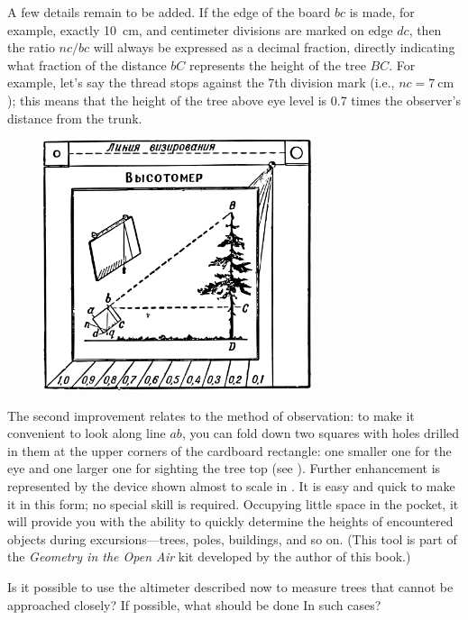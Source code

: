 A few details remain to be added. If the edge of the board $bc$ is made, for example, exactly \SI{10}{\centi\meter}, and centimeter divisions are marked on edge $dc$, then the ratio $nc/bc$ will always be expressed as a decimal fraction, directly indicating what fraction of the distance $bC$ represents the height of the tree $BC$. For example, let's say the thread stops against the 7th division mark (i.e., $nc = \SI{7}{\centi\meter}$); this means that the height of the tree above eye level is 0.7 times the observer's distance from the trunk.

\begin{figure}[h!]
\centering
\includegraphics[width=0.7\textwidth]{figures/ch-01/fig-01-12.pdf}
\end{figure}

The second improvement relates to the method of observation: to make it convenient to look along line $ab$, you can fold down two squares with holes drilled in them at the upper corners of the cardboard rectangle: one smaller one for the eye and one larger one for sighting the tree top (see ). Further enhancement is represented by the device shown almost to scale in . It is easy and quick to make it in this form; no special skill is required. Occupying little space in the pocket, it will provide you with the ability to quickly determine the heights of encountered objects during excursions—trees, poles, buildings, and so on. (This tool is part of the \emph{Geometry in the Open Air} kit developed by the author of this book.)



\ques Is it possible to use the altimeter described now to measure trees that cannot be approached closely? If possible, what should be done In such cases?


